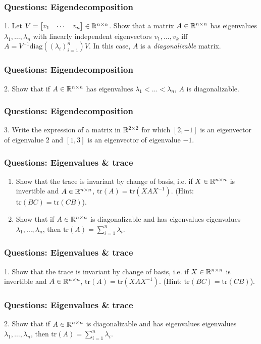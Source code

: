 \documentclass{beamer}
\begin{document}
\begin{frame}[t]
\frametitle{Questions: Eigendecomposition}
1. Let $V = \begin{bmatrix} v_1 & \cdots & v_n \end{bmatrix} \in \mathbb{R}^{n \times n}$. Show that a matrix $A \in \mathbb{R}^{n \times n}$ has eigenvalues $\lambda_1, \dots, \lambda_n$ with linearly independent eigenvectors $v_1, \dots, v_k$ iff $A = V^{-1} \text{diag}((\lambda_i)_{i=1}^n) V$. In this case, $A$ is a \emph{diagonalizable} matrix.
\pause
\end{frame}

\begin{frame}[t]
\frametitle{Questions: Eigendecomposition}
2. Show that if $A \in \mathbb{R}^{n \times n}$ has eigenvalues $\lambda_1 < \dots < \lambda_n$, $A$ is diagonalizable.
\end{frame}

\begin{frame}[t]
\frametitle{Questions: Eigendecomposition}
3. Write the expression of a matrix in $\mathbb{R}^{2 \times 2}$ for which $[2,-1]$ is an eigenvector of eigenvalue $2$ and $[1,3]$ is an eigenvector of eigenvalue $-1$.
\pause
\end{frame}

\begin{frame}[t]
\frametitle{Questions: Eigenvalues \& trace}
\begin{enumerate}
\item Show that the trace is invariant by change of basis, i.e. if $X \in \mathbb{R}^{n \times n}$ is invertible and $A \in \mathbb{R}^{n \times n}$, $\text{tr}(A) = \text{tr}(X A X^{-1})$. (Hint: $\text{tr}(BC) = \text{tr}(CB)$).
\item Show that if $A \in \mathbb{R}^{n \times n}$ is diagonalizable and has eigenvalues eigenvalues $\lambda_1, \dots, \lambda_n$, then $\text{tr}(A) = \sum_{i=1}^n \lambda_i$.
\end{enumerate}
\end{frame}

\begin{frame}[t]
\frametitle{Questions: Eigenvalues \& trace}
1. Show that the trace is invariant by change of basis, i.e. if $X \in \mathbb{R}^{n \times n}$ is invertible and $A \in \mathbb{R}^{n \times n}$, $\text{tr}(A) = \text{tr}(X A X^{-1})$. (Hint: $\text{tr}(BC) = \text{tr}(CB)$).
\pause
\end{frame}

\begin{frame}[t]
\frametitle{Questions: Eigenvalues \& trace}
2. Show that if $A \in \mathbb{R}^{n \times n}$ is diagonalizable and has eigenvalues eigenvalues $\lambda_1, \dots, \lambda_n$, then $\text{tr}(A) = \sum_{i=1}^n \lambda_i$.
\pause
\end{frame}
\end{document}
